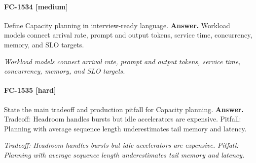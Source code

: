 \paragraph{FC-1534 [medium]} Define Capacity planning in interview-ready language.
\noindent\textbf{Answer.} Workload models connect arrival rate, prompt and output tokens, service time, concurrency, memory, and SLO targets.
\par\textit{Workload models connect arrival rate, prompt and output tokens, service time, concurrency, memory, and SLO targets.}
\paragraph{FC-1535 [hard]} State the main tradeoff and production pitfall for Capacity planning.
\noindent\textbf{Answer.} Tradeoff: Headroom handles bursts but idle accelerators are expensive. Pitfall: Planning with average sequence length underestimates tail memory and latency.
\par\textit{Tradeoff: Headroom handles bursts but idle accelerators are expensive. Pitfall: Planning with average sequence length underestimates tail memory and latency.}

